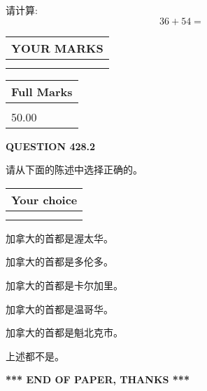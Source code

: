\documentclass{ctexart}
\begin{document}
  
 
请计算:
\begin{equation}
36 +  %
54 = \nonumber
\end{equation}
 

 

 
  
\vspace{0.2in}
  
\noindent\begin{tabular}{|l|}
\hline
 YOUR MARKS  \\
\hline
 \\ 
 \\ 
\hline
\end{tabular}
\hspace{0.05in} \begin{tabular}{|l|}
\hline
 Full Marks  \\
\hline
 \\ 
50.00 \\
\hline
\end{tabular}
{\textbf{\Large{QUESTION
428.2 
}}}
  
  
请从下面的陈述中选择正确的。
  
  
\noindent\hspace{3.0in} \begin{tabular}{|l|}
\hline
Your choice \\
\hline
 \\ 
 \\ 
\hline
\end{tabular}
  
  
 
 
加拿大的首都是渥太华。
 
 
加拿大的首都是多伦多。
 
 
加拿大的首都是卡尔加里。
 
 
加拿大的首都是温哥华。
 
 
加拿大的首都是魁北克市。
 
 
 上述都不是。
 
 
   
   
 \vspace{0.2in}
 
   
   
   
   
\vspace{1.0in} 
{\textbf{\large{ *** END OF PAPER, THANKS *** }}} 
   
\end{document}
